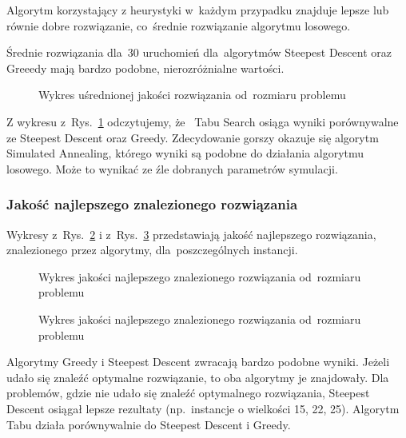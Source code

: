 \documentclass[a4paper,10pt]{article}
\begin{document}
Algorytm korzystający z heurystyki w~każdym przypadku znajduje lepsze lub równie dobre rozwiązanie, co~średnie rozwiązanie algorytmu losowego.

Średnie rozwiązania dla~30 uruchomień dla~algorytmów Steepest Descent oraz Greeedy mają bardzo podobne, nierozróżnialne wartości.

\begin{figure}[!htpb]
\begin{center}

\caption{Wykres uśrednionej jakości rozwiązania od~rozmiaru problemu}
\label{fig:qualityvssizemeanmeta}
\end{center}
\end{figure}

Z wykresu z~Rys.~\ref{fig:qualityvssizemeanmeta} odczytujemy, że~ Tabu Search  osiąga wyniki porównywalne ze Steepest Descent oraz Greedy.
Zdecydowanie gorszy okazuje się algorytm Simulated Annealing, którego wyniki są podobne do działania algorytmu losowego.
Może to wynikać ze źle dobranych parametrów symulacji. 

\subsubsection{Jakość najlepszego znalezionego rozwiązania}
Wykresy z~Rys.~\ref{fig:qualityvssizemax} i z~Rys.~\ref{fig:qualityvssizemaxmeta} przedstawiają jakość najlepszego rozwiązania, znalezionego przez algorytmy, dla~poszczególnych instancji.

\begin{figure}[!htpb]
\begin{center}

\caption{Wykres jakości najlepszego znalezionego rozwiązania od~rozmiaru problemu}
\label{fig:qualityvssizemax}
\end{center}
\end{figure}

\begin{figure}[!htpb]
\begin{center}

\caption{Wykres jakości najlepszego znalezionego rozwiązania od~rozmiaru problemu}
\label{fig:qualityvssizemaxmeta}
\end{center}
\end{figure}

Algorytmy Greedy i Steepest Descent zwracają bardzo podobne wyniki.
Jeżeli udało się znaleźć optymalne rozwiązanie, to oba algorytmy je znajdowały.
Dla problemów, gdzie nie udało się znaleźć optymalnego rozwiązania, Steepest Descent osiągał lepsze rezultaty (np.~instancje o wielkości 15, 22, 25).
Algorytm Tabu działa porównywalnie do Steepest Descent i Greedy.
\end{document}
